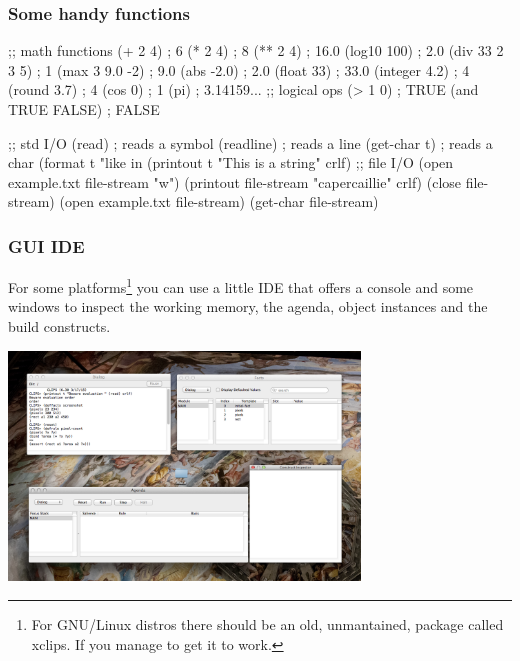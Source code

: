 \documentclass[xcolor={usenames,dvipsnames,svgnames}, compress]{beamer}
\begin{document}
\begin{frame}[fragile]
  \frametitle{Some handy functions}
  \begin{minipage}[t]{0.45\linewidth}
    \begin{clips-code}[numbers=none]
      ;; math functions
      (+ 2 4) ; 6
      (* 2 4) ; 8
      (** 2 4) ; 16.0
      (log10 100) ; 2.0
      (div 33 2 3 5) ; 1
      (max 3 9.0 -2) ; 9.0
      (abs -2.0) ; 2.0
      (float 33) ; 33.0
      (integer 4.2) ; 4
      (round 3.7) ; 4
      (cos 0) ; 1
      (pi) ; 3.14159...
      ;; logical ops
      (> 1 0) ; TRUE
      (and TRUE FALSE) ; FALSE
    \end{clips-code}
  \end{minipage}
  \begin{minipage}[t]{0.45\linewidth}
    \begin{clips-code}[numbers=none]
      ;; std I/O
      (read) ; reads a symbol
      (readline) ; reads a line
      (get-char t) ; reads a char
      (format t "like in %
      (printout t
          "This is a string" crlf)
      ;; file I/O
      (open example.txt
          file-stream "w")
      (printout file-stream
          "capercaillie" crlf)
      (close file-stream)
      (open example.txt
          file-stream)
      (get-char file-stream)
    \end{clips-code}
  \end{minipage}
\end{frame}

\begin{frame}
  \frametitle{GUI IDE}
  For some platforms\footnote{For GNU/Linux distros there should be an old,
    unmantained, package called \textsf{xclips}. If you manage to get
    it to work.} you can use a little IDE that offers a console
  and some windows to inspect the working memory, the agenda, object
  instances and the build constructs.
  \begin{center}
    \includegraphics[width=0.7\textwidth]{Figures/clips-IDE}
  \end{center}
  
  
\end{frame}
\end{document}
